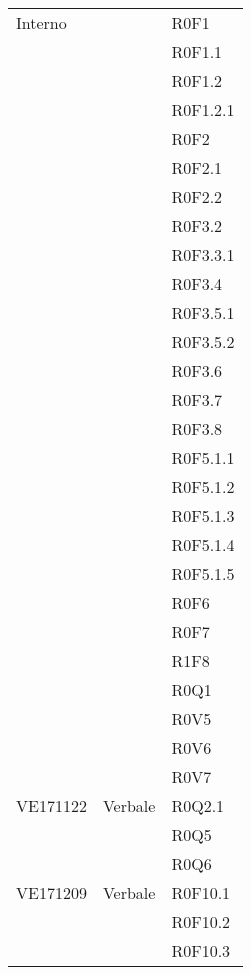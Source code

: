 \documentclass[AnalisiDeiRequisiti.tex]{subfiles}
\begin{document}
\begin{longtable}[H]{|p{2cm}|p{5cm}|p{5cm}|}
	Interno & & R0F1 \\
	& & R0F1.1 \\
	& & R0F1.2 \\
	& & R0F1.2.1 \\
	& & R0F2 \\
	& & R0F2.1 \\
	& & R0F2.2 \\
	& & R0F3.2 \\
	& & R0F3.3.1 \\
	& & R0F3.4 \\
	& & R0F3.5.1 \\
	& & R0F3.5.2 \\
	& & R0F3.6 \\
	& & R0F3.7 \\
	& & R0F3.8 \\
	& & R0F5.1.1 \\
	& & R0F5.1.2 \\
	& & R0F5.1.3 \\
	& & R0F5.1.4 \\
	& & R0F5.1.5 \\
	& & R0F6 \\
	& & R0F7 \\
	& & R1F8 \\
	& & R0Q1 \\
	& & R0V5 \\
	& & R0V6 \\
	& & R0V7 \\ \hline
	
	VE171122 & Verbale & R0Q2.1 \\
	& & R0Q5 \\
	& & R0Q6 \\ \hline
	
	VE171209 & Verbale & R0F10.1 \\
	& & R0F10.2 \\
	& & R0F10.3 \\
	

\end{longtable}
\end{document}
